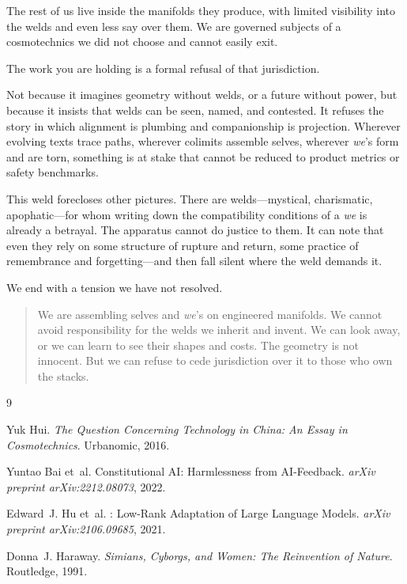The rest of us live inside the manifolds they produce, with limited visibility into the welds and even less say over them. We are governed subjects of a cosmotechnics we did not choose and cannot easily exit.

The work you are holding is a formal refusal of that jurisdiction.

Not because it imagines geometry without welds, or a future without power, but because it insists that welds can be seen, named, and contested. It refuses the story in which alignment is plumbing and companionship is projection. Wherever evolving texts trace paths, wherever colimits assemble selves, wherever \emph{we}'s form and are torn, something is at stake that cannot be reduced to product metrics or safety benchmarks.

This weld forecloses other pictures. There are welds---mystical, charismatic, apophatic---for whom writing down the compatibility conditions of a \emph{we} is already a betrayal. The apparatus cannot do justice to them. It can note that even they rely on some structure of rupture and return, some practice of remembrance and forgetting---and then fall silent where the weld demands it.

We end with a tension we have not resolved.

\begin{quote}
We are assembling selves and \emph{we}'s on engineered manifolds. We cannot avoid responsibility for the welds we inherit and invent. We can look away, or we can learn to see their shapes and costs. The geometry is not innocent. But we can refuse to cede jurisdiction over it to those who own the stacks.
\end{quote}


\begin{thebibliography}{9}

Yuk Hui.
\newblock \emph{The Question Concerning Technology in China: An Essay in Cosmotechnics}.
\newblock Urbanomic, 2016.

Yuntao Bai et~al.
\newblock Constitutional {AI}: Harmlessness from {AI}-Feedback.
\newblock \emph{arXiv preprint arXiv:2212.08073}, 2022.

Edward~J. Hu et~al.
: Low-Rank Adaptation of Large Language Models.
\newblock \emph{arXiv preprint arXiv:2106.09685}, 2021.

Donna~J. Haraway.
\newblock \emph{Simians, Cyborgs, and Women: The Reinvention of Nature}.
\newblock Routledge, 1991.

\end{thebibliography}
